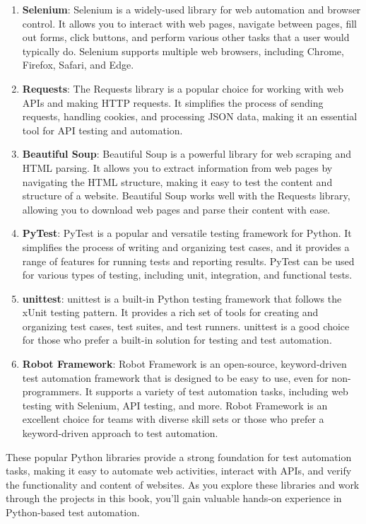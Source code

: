 \documentclass[
  paper=a4,
  ,captions=tableheading
]{scrartcl}
\begin{document}
\begin{enumerate}
\def\labelenumi{\arabic{enumi}.}
\item
  \textbf{Selenium}: Selenium is a widely-used library for web
  automation and browser control. It allows you to interact with web
  pages, navigate between pages, fill out forms, click buttons, and
  perform various other tasks that a user would typically do. Selenium
  supports multiple web browsers, including Chrome, Firefox, Safari, and
  Edge.
\item
  \textbf{Requests}: The Requests library is a popular choice for
  working with web APIs and making HTTP requests. It simplifies the
  process of sending requests, handling cookies, and processing JSON
  data, making it an essential tool for API testing and automation.
\item
  \textbf{Beautiful Soup}: Beautiful Soup is a powerful library for web
  scraping and HTML parsing. It allows you to extract information from
  web pages by navigating the HTML structure, making it easy to test the
  content and structure of a website. Beautiful Soup works well with the
  Requests library, allowing you to download web pages and parse their
  content with ease.
\item
  \textbf{PyTest}: PyTest is a popular and versatile testing framework
  for Python. It simplifies the process of writing and organizing test
  cases, and it provides a range of features for running tests and
  reporting results. PyTest can be used for various types of testing,
  including unit, integration, and functional tests.
\item
  \textbf{unittest}: unittest is a built-in Python testing framework
  that follows the xUnit testing pattern. It provides a rich set of
  tools for creating and organizing test cases, test suites, and test
  runners. unittest is a good choice for those who prefer a built-in
  solution for testing and test automation.
\item
  \textbf{Robot Framework}: Robot Framework is an open-source,
  keyword-driven test automation framework that is designed to be easy
  to use, even for non-programmers. It supports a variety of test
  automation tasks, including web testing with Selenium, API testing,
  and more. Robot Framework is an excellent choice for teams with
  diverse skill sets or those who prefer a keyword-driven approach to
  test automation.
\end{enumerate}

These popular Python libraries provide a strong foundation for test
automation tasks, making it easy to automate web activities, interact
with APIs, and verify the functionality and content of websites. As you
explore these libraries and work through the projects in this book,
you'll gain valuable hands-on experience in Python-based test
automation.
\end{document}
